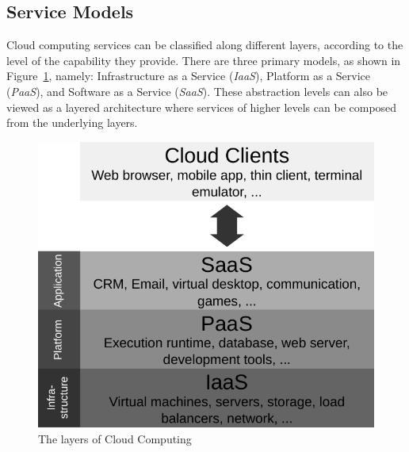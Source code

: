 \subsection{Service Models}

Cloud computing services can be classified along different layers, according to
the level of the capability they provide. There are three primary models, as
shown in Figure~\ref{fig:cloud_layers}, namely: Infrastructure as a Service
(\emph{IaaS}), Platform as a Service (\emph{PaaS}), and Software as a Service
(\emph{SaaS}). These abstraction levels can also be viewed as a layered
architecture where services of higher levels can be composed from the underlying
layers.

\begin{figure}[htbp]
  \begin{center}
    \includegraphics[width=1.0\maxwidth]{../figures/cloud_layers-black.pdf}
    \caption{The layers of Cloud Computing\label{fig:cloud_layers}}
   \end{center}
\end{figure}

